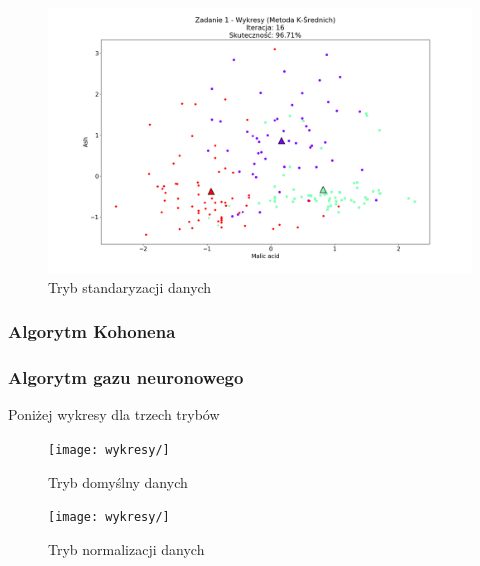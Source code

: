 \documentclass{classrep}
\begin{document}
{{{				\begin{figure}[!htbp]
					\includegraphics[width=\textwidth]{wykresy/plot_k_meansWineStandardise.png}
					\caption{Tryb standaryzacji danych}
				\end{figure}
			\FloatBarrier
		}

		\subsubsection{Algorytm Kohonena}
		{

		}

		\subsubsection{Algorytm gazu neuronowego}
		{
			\iffalse
			Poniżej wykresy dla trzech trybów
				\begin{figure}[!htbp]
					\texttt{[image: wykresy/]}
					\caption{Tryb domyślny danych}
				\end{figure}
			
				\begin{figure}[!htbp]
					\texttt{[image: wykresy/]}
					\caption{Tryb normalizacji danych}
				\end{figure}
		
}}}
\end{document}
